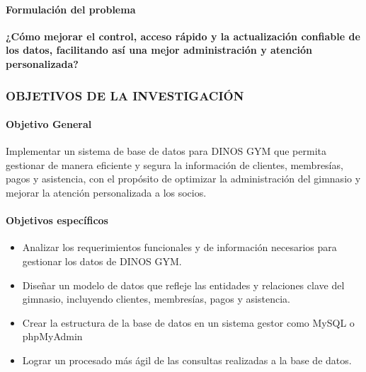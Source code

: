 \documentclass[12pt, letterpaper]{article}
\begin{document}
\paragraph{Formulación del problema}
\textbf{¿Cómo mejorar el control, acceso rápido y la actualización confiable de los datos, facilitando así una mejor administración y atención personalizada?}\\
\subsubsection{OBJETIVOS DE LA INVESTIGACIÓN}
\paragraph{Objetivo General}
Implementar un sistema de base de datos para DINOS GYM que permita gestionar de manera eficiente y segura la información de clientes, membresías, pagos y asistencia, con el propósito de optimizar la administración del gimnasio y mejorar la atención personalizada a los socios.\\
\paragraph{Objetivos específicos}
\begin{itemize}
    \item Analizar los requerimientos funcionales y de información necesarios para gestionar los datos de DINOS GYM.
    \item Diseñar un modelo de datos que refleje las entidades y relaciones clave del gimnasio, incluyendo clientes, membresías, pagos y asistencia.
    \item Crear la estructura de la base de datos en un sistema gestor como MySQL o phpMyAdmin
    \item Lograr un procesado más ágil de las consultas realizadas a la base de datos.
\end{itemize}
\newpage
\end{document}
